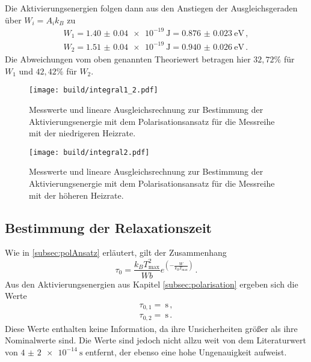Die Aktivierungsenergien folgen dann aus den Anstiegen der
Ausgleichsgeraden über $W_i=A_i k_B$ zu
\begin{align*}
	W_1=\SI{1.40(4)e-19}{\joule}=\SI{0.876(23)}{\eV} \,, \\
	W_2=\SI{1.51(4)e-19}{\joule}=\SI{0.940(26)}{\eV} \,.
\end{align*}
Die Abweichungen vom oben genannten Theoriewert betragen hier
$32{,}72\%$ für $W_1$ und $42{,}42\%$ für $W_2$.

\begin{figure}
  \centering
  \texttt{[image: build/integral1\_2.pdf]}
  \caption{Messwerte und lineare Ausgleichsrechnung zur Bestimmung der Aktivierungsenergie mit dem Polarisationsansatz für
  die Messreihe mit der niedrigeren Heizrate.}
  \label{fig:integral1_2}
\end{figure}
\begin{figure}
  \centering
  \texttt{[image: build/integral2.pdf]}
  \caption{Messwerte und lineare Ausgleichsrechnung zur Bestimmung der Aktivierungsenergie mit dem Polarisationsansatz für
  die Messreihe mit der höheren Heizrate.}
  \label{fig:integral2}
\end{figure}

\subsection{Bestimmung der Relaxationszeit}

Wie in \ref{subsec:polAnsatz} erläutert, gilt der Zusammenhang
\begin{equation*}
	\tau_0=\frac{k_B T_{\text{max}}^2}{W b} e^{\left(-\frac{W}{k_B T_{\text{max}}}\right)} \,.
\end{equation*}
Aus den Aktivierungsenergien aus Kapitel \ref{subsec:polarisation} ergeben sich die Werte
\begin{align*}
	\tau_{0,1}=\SI{}{\second} \,, \\
	\tau_{0,2}=\SI{}{\second} \,.
\end{align*}
\cite{Grund für große Fehler?}
Diese Werte enthalten keine Information, da ihre Unsicherheiten größer als ihre Nominalwerte sind. Die Werte sind jedoch nicht allzu weit von dem Literaturwert von $\SI{4(2)e-14}{\second}$ \cite{lit} entfernt, der ebenso eine hohe Ungenauigkeit aufweist.
